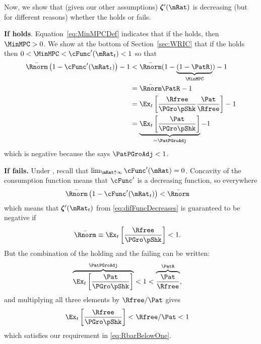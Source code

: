 \documentclass[\econtexRoot/BufferStockTheory]{subfiles}
\begin{document}
Now, we show that (given our other assumptions) $\difFunc^{\prime}(\mRat)$ is decreasing (but for different reasons) whether the {\RIC} holds or fails.

\textbf{If {\RIC} holds}. Equation~\eqref{eq:MinMPCDef} indicates that if the {\RIC} holds, then $\MinMPC >0$.  We show at the bottom of Section~\ref{sec:WRIC} that if the {\RIC} holds then $0 < \MinMPC < \cFunc^{\prime}(\mRat_{t}) < 1$ so that 
\begin{align*}
  \bar{\Rnorm}\left(1-\cFunc^{\prime}({\mRat}_t)\right) - 1 & <  \bar{\Rnorm}(1-\underbrace{(1-\PatR)}_{\MinMPC}) - 1  \\
                                                            & = \bar{\Rnorm}\PatR - 1 \\
                                                            & = \Ex_{t}\left[\frac{\Rfree}{\PGro \pShk}\frac{\Pat}{\Rfree}\right] - 1 \\
                                                            & = \underbrace{\Ex_{t}\left[\frac{\Pat}{\PGro \pShk}\right]}_{= \PatPGroAdj} - 1 
\end{align*}
which is negative because the {\GICNrm} says $\PatPGroAdj < 1$.  

\textbf{If {\RIC} fails.}
Under \cncl{\RIC}, recall that $\lim_{\mRat \uparrow \infty} \cFunc^{\prime}(\mRat) = 0$.  Concavity of the consumption function means that $\cFunc^{\prime}$ is a decreasing function, so everywhere 
\begin{align*}
  \bar{\Rnorm}\left(1-\cFunc^{\prime}({\mRat}_t)\right) & < \bar{\Rnorm}
\end{align*}
which means that $\difFunc^{\prime}(\mRat_{t})$ from \eqref{eq:difFuncDecreases} is guaranteed to be negative if
\begin{equation}\begin{gathered}\begin{aligned}
  \bar{\Rnorm} \equiv \Ex_{t}\left[\frac{\Rfree}{\PGro \pShk}\right] & < 1  \label{eq:RbarBelowOne}.
\end{aligned}\end{gathered}\end{equation}
But the combination of the {\GICNrm} holding and the {\RIC} failing can be written:
\begin{align*}
  \overbrace{\Ex_{t}\left[\frac{\Pat}{\PGro \pShk}\right]}^{\PatPGroAdj} & < 1 < \overbrace{\frac{\Pat}{\Rfree}}^{{\PatR}},
\end{align*}
and multiplying all three elements by $\Rfree/\Pat$ gives 
\begin{align*}
  \Ex_{t}\left[\frac{\Rfree}{\PGro \pShk}\right] & < \Rfree/\Pat < 1
\end{align*}
which satisfies our requirement in \eqref{eq:RbarBelowOne}.
\end{document}

